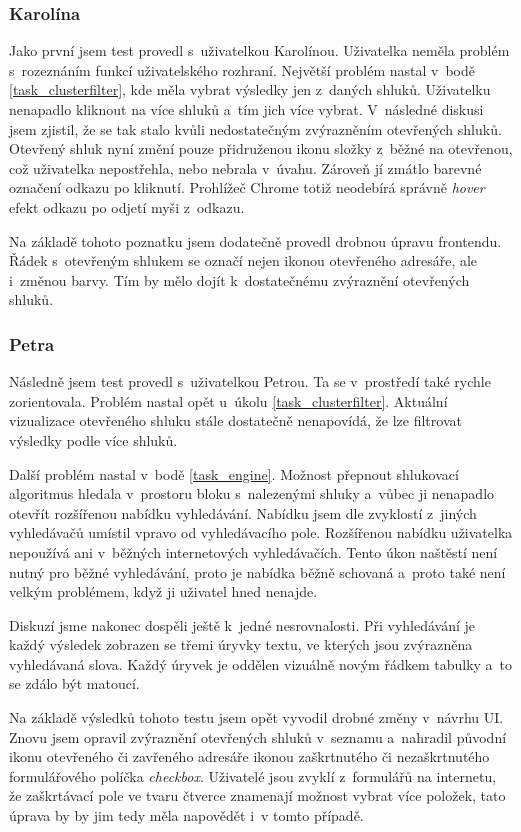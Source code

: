 \subsubsection{Karolína}
Jako první jsem test provedl s~uživatelkou Karolínou. Uživatelka neměla problém s~rozeznáním funkcí uživatelského rozhraní. Největší problém nastal v~bodě \ref{task_clusterfilter}, kde měla vybrat výsledky jen z~daných shluků. Uživatelku nenapadlo kliknout na více shluků a~tím jich více vybrat. V~následné diskusi jsem zjistil, že se tak stalo kvůli nedostatečným zvýrazněním otevřených shluků. Otevřený shluk nyní změní pouze přidruženou ikonu složky z~běžné na otevřenou, což uživatelka nepostřehla, nebo nebrala v~úvahu. Zároveň jí zmátlo barevné označení odkazu po kliknutí. Prohlížeč Chrome totiž neodebírá správně \emph{hover} efekt odkazu po odjetí myši z~odkazu.

Na základě tohoto poznatku jsem dodatečně provedl drobnou úpravu frontendu. Řádek s~otevřeným shlukem se označí nejen ikonou otevřeného adresáře, ale i~změnou barvy. Tím by mělo dojít k~dostatečnému zvýraznění otevřených shluků.

\subsubsection{Petra}
Následně jsem test provedl s~uživatelkou Petrou. Ta se v~prostředí také rychle zorientovala. Problém nastal opět u~úkolu \ref{task_clusterfilter}. Aktuální vizualizace otevřeného shluku stále dostatečně nenapovídá, že lze filtrovat výsledky podle více shluků.

Další problém nastal v~bodě \ref{task_engine}. Možnost přepnout shlukovací algoritmus hledala v~prostoru bloku s~nalezenými shluky a~vůbec ji nenapadlo otevřít rozšířenou nabídku vyhledávání. Nabídku jsem dle zvyklostí z~jiných vyhledávačů umístil vpravo od vyhledávacího pole. Rozšířenou nabídku uživatelka nepoužívá ani v~běžných internetových vyhledávačích. Tento úkon naštěstí není nutný pro běžné vyhledávání, proto je nabídka běžně schovaná a~proto také není velkým problémem, když ji uživatel hned nenajde. 

Diskuzí jsme nakonec dospěli ještě k~jedné nesrovnalosti. Při vyhledávání je každý výsledek zobrazen se třemi úryvky textu, ve kterých jsou zvýrazněna vyhledávaná slova. Každý úryvek je oddělen vizuálně novým řádkem tabulky a~to se zdálo být matoucí.

Na základě výsledků tohoto testu jsem opět vyvodil drobné změny v~návrhu UI. Znovu jsem opravil zvýraznění otevřených shluků v~seznamu a~nahradil původní ikonu otevřeného či zavřeného adresáře ikonou zaškrtnutého či nezaškrtnutého formulářového políčka \emph{checkbox}. Uživatelé jsou zvyklí z~formulářů na internetu, že zaškrtávací pole ve tvaru čtverce znamenají možnost vybrat více položek, tato úprava by by jim tedy měla napovědět i~v tomto případě.


